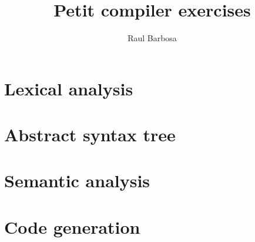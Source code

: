 \documentclass{article}
\begin{document}
\title{Petit compiler exercises}
\author{Raul Barbosa}
\maketitle

\section{Lexical analysis}


\section{Abstract syntax tree}


\section{Semantic analysis}


\section{Code generation}

\end{document}
